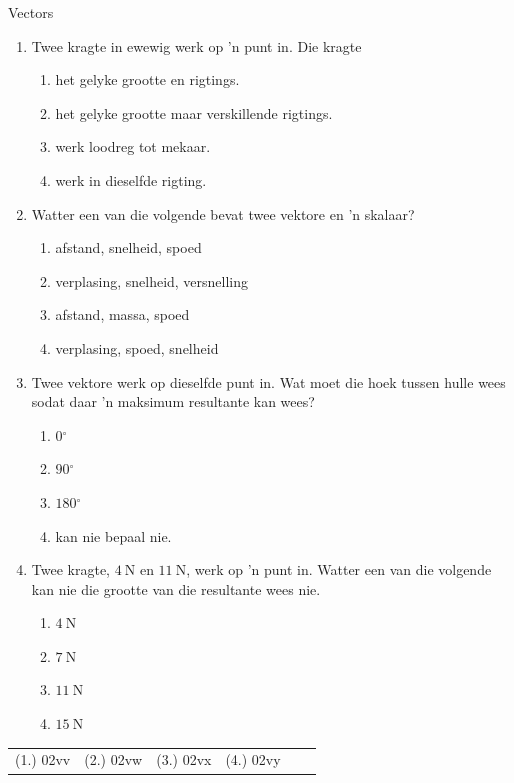 \begin{eocexercises}{Vectors}\noindent
\begin{enumerate}[noitemsep, label=\textbf{\arabic*}.]
\item Twee kragte in ewewig werk op  'n punt in. Die kragte
\begin{enumerate}[noitemsep, label=\textbf{\alph*}. ] 
    \item het gelyke grootte en rigtings.
    \item het gelyke grootte maar verskillende rigtings.
    \item werk loodreg tot mekaar.
    \item werk in dieselfde rigting.
\end{enumerate}

\item Watter een van die volgende bevat twee vektore en  'n skalaar?
\begin{enumerate}[noitemsep, label=\textbf{\alph*}. ] 
    \item afstand, snelheid, spoed
    \item verplasing, snelheid, versnelling
    \item afstand, massa, spoed
    \item verplasing, spoed, snelheid
\end{enumerate}


\label{m38819*uid107}\item Twee vektore werk op dieselfde punt in. Wat moet die hoek tussen hulle wees sodat daar  'n maksimum resultante kan wees?
\begin{enumerate}[noitemsep, label=\textbf{\alph*}. ] 
    \item $0{}^{\circ }$
    \item $90{}^{\circ }$
    \item $180{}^{\circ }$
    \item kan nie bepaal nie.
\end{enumerate}

\item Twee kragte, $4 ~\text{N}$ en $11 ~\text{N}$, werk op  'n punt in. Watter een van die volgende kan nie die grootte van die resultante wees nie.
\begin{enumerate}[noitemsep, label=\textbf{\alph*}. ] 
    \item $4 ~\text{N}$
    \item $7 ~\text{N}$
    \item $11 ~\text{N}$
    \item $15 ~\text{N}$
\end{enumerate}

\end{enumerate}

\practiceinfo
 \par \begin{tabular}[h]{cccccc}
 (1.) 02vv  &  (2.) 02vw  & (3.) 02vx & (4.) 02vy & \end{tabular}
\end{eocexercises}
